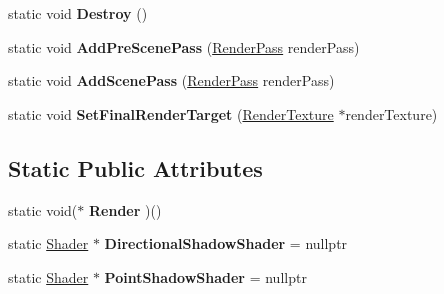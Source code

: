 \begin{DoxyCompactItemize}
\item 
\hypertarget{classBrickware_1_1Graphics_1_1RenderingManager_a5ae6fdc0633faeef713eeea1c8e78d62}{}static void {\bfseries Destroy} ()\label{classBrickware_1_1Graphics_1_1RenderingManager_a5ae6fdc0633faeef713eeea1c8e78d62}

\item 
\hypertarget{classBrickware_1_1Graphics_1_1RenderingManager_ae2b0e65b9d1d98d29e15d2cac3cc2c15}{}static void {\bfseries Add\+Pre\+Scene\+Pass} (\hyperlink{structBrickware_1_1Graphics_1_1RenderPass}{Render\+Pass} render\+Pass)\label{classBrickware_1_1Graphics_1_1RenderingManager_ae2b0e65b9d1d98d29e15d2cac3cc2c15}

\item 
\hypertarget{classBrickware_1_1Graphics_1_1RenderingManager_a9dc167d4b6fbb3934eb7a51538c84ad5}{}static void {\bfseries Add\+Scene\+Pass} (\hyperlink{structBrickware_1_1Graphics_1_1RenderPass}{Render\+Pass} render\+Pass)\label{classBrickware_1_1Graphics_1_1RenderingManager_a9dc167d4b6fbb3934eb7a51538c84ad5}

\item 
\hypertarget{classBrickware_1_1Graphics_1_1RenderingManager_af1b58c9027cab55973d89aa9c4993d86}{}static void {\bfseries Set\+Final\+Render\+Target} (\hyperlink{classBrickware_1_1Graphics_1_1RenderTexture}{Render\+Texture} $\ast$render\+Texture)\label{classBrickware_1_1Graphics_1_1RenderingManager_af1b58c9027cab55973d89aa9c4993d86}

\end{DoxyCompactItemize}
\subsection*{Static Public Attributes}
\begin{DoxyCompactItemize}
\item 
\hypertarget{classBrickware_1_1Graphics_1_1RenderingManager_a737fec4782b7a8a16e5bd49e39596f90}{}static void($\ast$ {\bfseries Render} )()\label{classBrickware_1_1Graphics_1_1RenderingManager_a737fec4782b7a8a16e5bd49e39596f90}

\item 
\hypertarget{classBrickware_1_1Graphics_1_1RenderingManager_a511699e6aa6ad16b2faf9b4077b1a3fa}{}static \hyperlink{classBrickware_1_1Graphics_1_1Shader}{Shader} $\ast$ {\bfseries Directional\+Shadow\+Shader} = nullptr\label{classBrickware_1_1Graphics_1_1RenderingManager_a511699e6aa6ad16b2faf9b4077b1a3fa}

\item 
\hypertarget{classBrickware_1_1Graphics_1_1RenderingManager_a6003aef7c41fd39a0030e7f7c35488ed}{}static \hyperlink{classBrickware_1_1Graphics_1_1Shader}{Shader} $\ast$ {\bfseries Point\+Shadow\+Shader} = nullptr\label{classBrickware_1_1Graphics_1_1RenderingManager_a6003aef7c41fd39a0030e7f7c35488ed}

\end{DoxyCompactItemize}
